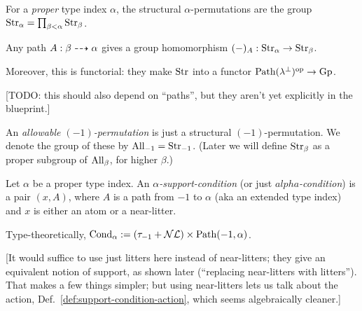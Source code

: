 \begin{definition}
  \label{def:structural-perm}
  \leanok
  For a \emph{proper} type index $\alpha$, the structural $\alpha$-permutations are the group $\mathrm{Str}_\alpha = \prod_{\beta < \alpha} \mathrm{Str}_\beta$.
\end{definition}

\begin{definition}
  \label{def:structural-perm-derivative}
  \leanok
  Any path $A : \beta \dashrightarrow \alpha$ gives a group homomorphism $(-)_A : \mathrm{Str}_\alpha \to \mathrm{Str}_\beta$.

  Moreover, this is functorial: they make $\mathrm{Str}$ into a functor $\mathrm{Path}(\lambda^\bot)^{\mathrm{op}} \to \mathrm{Gp}$.

  [TODO: this should also depend on “paths”, but they aren’t yet explicitly in the blueprint.]
\end{definition}

\begin{definition}
  \label{def:allowable-perm-atoms}
  An \emph{allowable $(-1)$-permutation} is just a structural $(-1)$-permutation. We denote the group of these by $\mathrm{All}_{-1} = \mathrm{Str}_{-1}$.  (Later we will define $\mathrm{Str}_\beta$ as a proper subgroup of $\mathrm{All}_\beta$, for higher $\beta$.)
\end{definition}

\begin{definition}
  \label{def:support-condition}
  \leanok
  Let $\alpha$ be a proper type index. An \emph{$\alpha$-support-condition} (or just \emph{$alpha$-condition}) is a pair $(x,A)$, where $A$ is a path from $-1$ to $\alpha$ (aka an extended type index) and $x$ is either an atom or a near-litter.

  Type-theoretically, $\mathrm{Cond}_\alpha := (\tau_{-1} + \mathcal{NL}) \times \mathrm{Path}(-1,\alpha)$.

  [It would suffice to use just litters here instead of near-litters; they give an equivalent notion of support, as shown later (“replacing near-litters with litters”).  That makes a few things simpler; but using near-litters lets us talk about the action, Def.~\ref{def:support-condition-action}, which seems algebraically cleaner.]
\end{definition}

